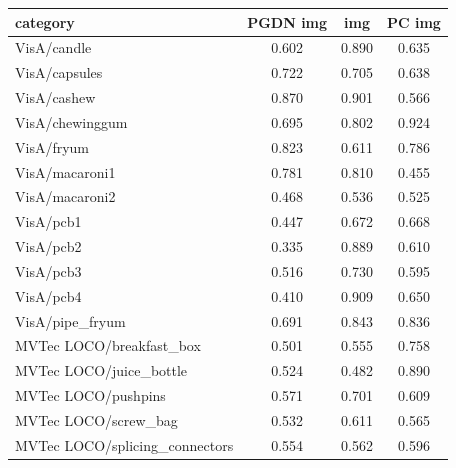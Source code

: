 \setlength{\tabcolsep}{3pt}
\begin{tabular}{@{}lccc@{}}
\toprule
category & PGDN img & \draem{} img & PC img \\
\midrule
VisA/candle & 0.602 & 0.890 & 0.635 \\
VisA/capsules & 0.722 & 0.705 & 0.638 \\
VisA/cashew & 0.870 & 0.901 & 0.566 \\
VisA/chewinggum & 0.695 & 0.802 & 0.924 \\
VisA/fryum & 0.823 & 0.611 & 0.786 \\
VisA/macaroni1 & 0.781 & 0.810 & 0.455 \\
VisA/macaroni2 & 0.468 & 0.536 & 0.525 \\
VisA/pcb1 & 0.447 & 0.672 & 0.668 \\
VisA/pcb2 & 0.335 & 0.889 & 0.610 \\
VisA/pcb3 & 0.516 & 0.730 & 0.595 \\
VisA/pcb4 & 0.410 & 0.909 & 0.650 \\
VisA/pipe\_fryum & 0.691 & 0.843 & 0.836 \\
MVTec LOCO/breakfast\_box & 0.501 & 0.555 & 0.758 \\
MVTec LOCO/juice\_bottle & 0.524 & 0.482 & 0.890 \\
MVTec LOCO/pushpins & 0.571 & 0.701 & 0.609 \\
MVTec LOCO/screw\_bag & 0.532 & 0.611 & 0.565 \\
MVTec LOCO/splicing\_connectors & 0.554 & 0.562 & 0.596 \\
\bottomrule
\end{tabular}
